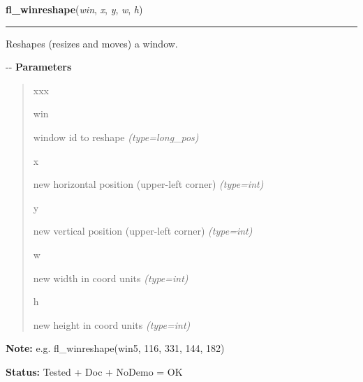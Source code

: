 \hspace{.8\funcindent}\begin{boxedminipage}{\funcwidth}

    \raggedright \textbf{fl\_winreshape}(\textit{win}, \textit{x}, \textit{y}, \textit{w}, \textit{h})

    \vspace{-1.5ex}

    \rule{\textwidth}{0.5\fboxrule}
\setlength{\parskip}{2ex}

Reshapes (resizes and moves) a window.

-{}-
\setlength{\parskip}{1ex}
      \textbf{Parameters}
      \vspace{-1ex}

      \begin{quote}
        \begin{Ventry}{xxx}

          \item[win]


window id to reshape
            {\it (type=long\_pos)}

          \item[x]


new horizontal position (upper-left corner)
            {\it (type=int)}

          \item[y]


new vertical position (upper-left corner)
            {\it (type=int)}

          \item[w]


new width in coord units
            {\it (type=int)}

          \item[h]


new height in coord units
            {\it (type=int)}

        \end{Ventry}

      \end{quote}

\textbf{Note:} 
e.g. fl\_winreshape(win5, 116, 331, 144, 182)


\textbf{Status:} 
Tested + Doc + NoDemo = OK


    \end{boxedminipage}

    \label{xformslib:flxbasic:fl_winicon}

